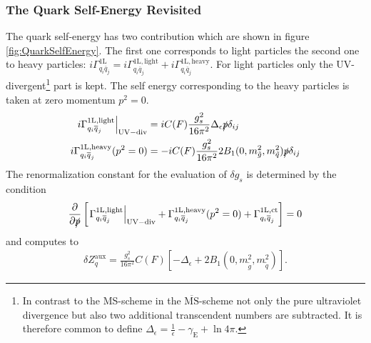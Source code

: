 \subsubsection*{The Quark Self-Energy Revisited}
The quark self-energy has two contribution which are shown in figure \ref{fig:QuarkSelfEnergy}. The first one corresponds to light particles the second one to heavy particles: $i\Gamma^{\mathrm{1L}}_{q_i\overline{q}_j} = i\Gamma^{\mathrm{1L,light}}_{q_i\overline{q}_j} + i\Gamma^{\mathrm{1L,heavy}}_{q_i\overline{q}_j}$. For light particles only the UV-divergent\footnote{In contrast to the MS-scheme in the $\overline{\mathrm{MS}}$-scheme not only the pure ultraviolet divergence but also two additional transcendent numbers are subtracted. It is therefore common to define $\Delta_\epsilon = \frac{1}{\epsilon} -\gamma_{\mathrm{E}} + \ln 4\pi$.} part is kept. 
The self energy corresponding to the heavy particles is taken at zero momentum $p^2=0$.
\begin{align}
\left.i\Gamma^{\mathrm{1L,light}}_{q_i\overline{q}_j}\right|_{\mathrm{UV-div}} &= i C(F) \frac{g_s^2}{16\pi^2} \Delta_\epsilon \slashed{p} \delta_{ij}\\
i\Gamma^{\mathrm{1L,heavy}}_{q_i\overline{q}_j}(p^2=0) &= -i C(F) \frac{g_s^2}{16\pi^2} 2B_1(0, m_{\tilde{g}}^2, m_{\tilde{q}}^2)\slashed{p}\delta_{ij}
\end{align}
The renormalization constant for the evaluation of $\delta g_s$ is determined by the condition
\begin{align}
\frac{\partial}{\partial \slashed{p}} \left[  \left.\Gamma^{\mathrm{1L,light}}_{q_i\overline{q}_j}\right|_{\mathrm{UV-div}} + \Gamma^{\mathrm{1L,heavy}}_{q_i\overline{q}_j}(p^2=0) + \Gamma^{\mathrm{1L,ct}}_{q_i\overline{q}_j}  \right] = 0
\end{align}
and computes to
\begin{align}
\delta Z_q^{\mathrm{aux}} = \frac{g_s^2}{16\pi^2} C(F)\left[ -\Delta_\epsilon + 2B_1(0, m_{\tilde{g}}^2, m_{\tilde{q}}^2)\right] .
\end{align}


